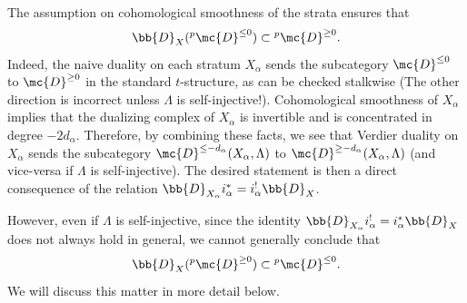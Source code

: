 \documentclass[letterpaper,11pt]{amsart}
\begin{document}
\begin{remark}{\label{rem: dualityinterchangingtstructures}}
The assumption on cohomological smoothness of the strata ensures that 
\[ \bb{D}_{X}(\phantom{}^{p}\mc{D}^{\leq 0}) \subset \phantom{}^{p}\mc{D}^{\geq 0}. \]
Indeed, the naive duality on each stratum $X_\alpha$ sends the subcategory $\mc{D}^{\leq 0}$ to $\mc{D}^{\geq 0}$ in the standard $t$-structure, as can be checked stalkwise (The other direction is incorrect unless $\Lambda$ is self-injective!). Cohomological smoothness of $X_\alpha$ implies that the dualizing complex of $X_\alpha$ is invertible and is concentrated in degree $-2d_\alpha$. Therefore, by combining these facts, we see that Verdier duality on $X_\alpha$ sends the subcategory $\mc{D}^{\leq -d_\alpha}(X_\alpha,\Lambda)$ to $\mc{D}^{\geq -d_\alpha}(X_\alpha,\Lambda)$ (and vice-versa if $\Lambda$ is self-injective). The desired statement is then a direct consequence of the relation  $\bb{D}_{X_{\alpha}}i_{\alpha}^{*} = i_{\alpha}^{!}\bb{D}_{X}$. 

However, even if $\Lambda$ is self-injective, since the identity $\bb{D}_{X_{\alpha}}i_{\alpha}^{!} = i_{\alpha}^{*}\bb{D}_{X}$ does not always hold in general, we cannot generally conclude that
\[ \bb{D}_{X}(\phantom{}^{p}\mc{D}^{\geq 0}) \subset \phantom{}^{p}\mc{D}^{\leq 0}.\]
We will discuss this matter in more detail below.
\end{remark}
\end{document}
